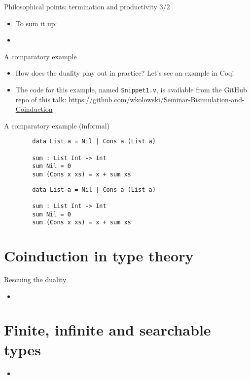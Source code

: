\documentclass{beamer}
\begin{document}
\begin{frame}{Philosophical points: termination and productivity 3/2}
\begin{itemize}
	\item To sum it up:
	\item 
\end{itemize}
\end{frame}

\begin{frame}{A comparatory example}
\begin{itemize}
	\item How does the duality play out in practice? Let's see an example in Coq!
	\item The code for this example, named \texttt{Snippet1.v}, is available from the GitHub repo of this talk: \url{https://github.com/wkolowski/Seminar-Bisimulation-and-Coinduction}
\end{itemize}
\end{frame}

\begin{frame}[fragile]{A comparatory example (informal)}
\noindent
\begin{minipage}[l]{0.45\linewidth}
	\begin{verbatim}
		data List a = Nil | Cons a (List a)

		sum : List Int -> Int
		sum Nil = 0
		sum (Cons x xs) = x + sum xs
	\end{verbatim}
\end{minipage}
\noindent
\begin{minipage}[b]{0.45\linewidth}
	\begin{verbatim}
		data List a = Nil | Cons a (List a)

		sum : List Int -> Int
		sum Nil = 0
		sum (Cons x xs) = x + sum xs
	\end{verbatim}
\end{minipage}
\end{frame}



\section{Coinduction in type theory}

\begin{frame}{Rescuing the duality}
\begin{itemize}
	\item 
\end{itemize}
\end{frame}

\section{Finite, infinite and searchable types}

\begin{frame}{}
\begin{itemize}
	\item 
\end{itemize}
\end{frame}
\end{document}
